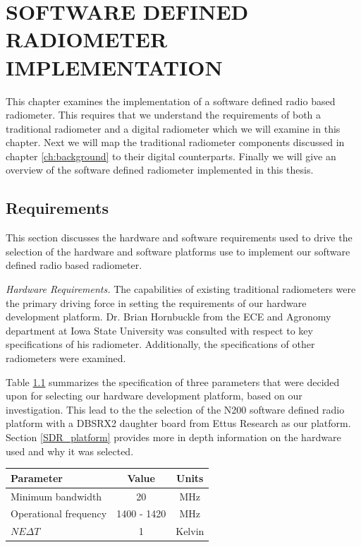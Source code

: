 \chapter{SOFTWARE DEFINED RADIOMETER IMPLEMENTATION}\label{ch:implementation}

This chapter examines the implementation of a software defined radio based radiometer.  This requires that we understand the requirements of both a traditional radiometer and a digital radiometer which we will examine in this chapter.  Next we will map the traditional radiometer components discussed in chapter \ref{ch:background} to their digital counterparts.  Finally we will give an overview of the software defined radiometer implemented in this thesis.

\section{Requirements}\label{requirements}

This section discusses the hardware and software requirements used to drive the selection of the hardware and software platforms use to implement our software defined radio based radiometer.  

\emph{Hardware Requirements.}  The capabilities of existing traditional radiometers were the primary driving force in setting the requirements of our hardware development platform.  Dr. Brian Hornbuckle from the ECE and Agronomy department at Iowa State University was consulted with respect to key specifications of his radiometer.  Additionally, the specifications of other radiometers were examined. 

Table \ref{rad_performance} summarizes the specification of three parameters that were decided upon for selecting our hardware development platform, based on our investigation.  This lead to the the selection of the N200 software defined radio platform with a DBSRX2 daughter board from Ettus Research as our platform.  Section \ref{SDR_platform} provides more in depth information on the hardware used and why it was selected.

\begin{table}[h!tb] \centering
{}
\label{rad_performance}
\begin{tabular}{lcc} \hline
\textbf{Parameter} & \textbf{Value} & \textbf{Units} \\ \hline
Minimum bandwidth & 20 & MHz \\
Operational frequency & 1400 - 1420 & MHz \\
$NE\Delta T$ & 1 & Kelvin \\ \hline
\end{tabular}
\end{table}

